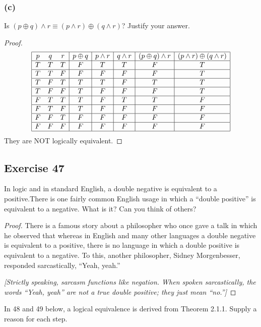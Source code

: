 \documentclass[14pt]{extarticle}
\begin{document}
\subsubsection{(c)}
Is $(p \oplus q) \wedge r \equiv (p \wedge r) \oplus (q \wedge r)$? Justify your
answer.

\begin{proof}
$$
\begin{array}{|ccc|c|c|c|c|c|}
\hline
p & q & r & p \oplus q & p \wedge r & q \wedge r & 
(p \oplus q) \wedge r & (p \wedge r) \oplus (q \wedge r) \\
\hline
T & T & T & F & T & T & F & T \\
\hline
T & T & F & F & F & F & F & T \\
\hline
T & F & T & T & T & F & T & T \\
\hline
T & F & F & T & F & F & F & T \\
\hline
F & T & T & T & F & T & T & F \\
\hline
F & T & F & T & F & F & F & F \\
\hline
F & F & T & F & F & F & F & F \\
\hline
F & F & F & F & F & F & F & F \\
\hline
\end{array}
$$
They are NOT logically equivalent.
\end{proof}

\subsection{Exercise 47}
In logic and in standard English, a double negative is equivalent to a
positive.There is one fairly common English usage in which a “double positive”
is equivalent to a negative. What is it? Can you think of others?

\begin{proof}
There is a famous story about a philosopher who once gave a talk in which he
observed that whereas in English and many other languages a double negative is
equivalent to a positive, there is no language in which a double positive is
equivalent to a negative. To this, another philosopher, Sidney Morgenbesser,
responded sarcastically, “Yeah, yeah.”

{\it [Strictly speaking, sarcasm functions like negation. When spoken
sarcastically, the words “Yeah, yeah” are not a true double positive; they just
mean “no.”]}
\end{proof}

In 48 and 49 below, a logical equivalence is derived from Theorem 2.1.1. Supply
a reason for each step.
\end{document}
